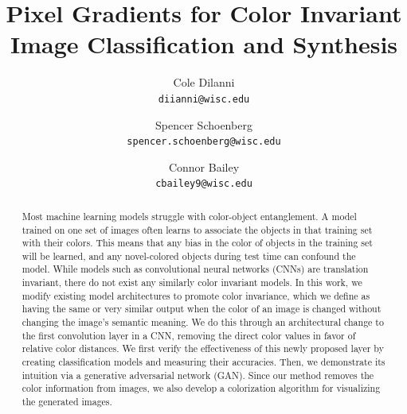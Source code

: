\documentclass[10pt,twocolumn,letterpaper]{article}
\begin{document}
\title{Pixel Gradients for Color Invariant Image Classification and Synthesis}

\author{Cole Dilanni \\
{\tt\small diianni@wisc.edu}
\and
Spencer Schoenberg \\
{\tt\small spencer.schoenberg@wisc.edu}
\and
Connor Bailey \\
{\tt\small cbailey9@wisc.edu}
}
\maketitle

\begin{abstract}
    Most machine learning models struggle with color-object entanglement. A model trained on one set of images often learns to associate the objects in that training set with their colors. This means that any bias in the color of objects in the training set will be learned, and any novel-colored objects during test time can confound the model. While models such as convolutional neural networks (CNNs) are translation invariant, there do not exist any similarly color invariant models. In this work, we modify existing model architectures to promote color invariance, which we define as having the same or very similar output when the color of an image is changed without changing the image's semantic meaning. We do this through an architectural change to the first convolution layer in a CNN, removing the direct color values in favor of relative color distances. We first verify the effectiveness of this newly proposed layer by creating classification models and measuring their accuracies. Then, we demonstrate its intuition via a generative adversarial network (GAN). Since our method removes the color information from images, we also develop a colorization algorithm for visualizing the generated images.
\end{abstract}
\end{document}
